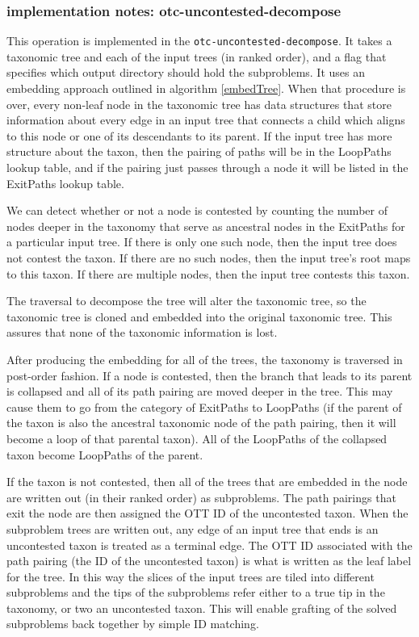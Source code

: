 \documentclass[11pt]{article}
\begin{document}
\subsubsection{implementation notes: otc-uncontested-decompose}
This operation is implemented in the {\tt otc-uncontested-decompose}.
It takes a taxonomic tree and each of the input trees (in ranked order), and a flag
    that specifies which output directory should hold the subproblems.
It uses an embedding approach outlined in algorithm \ref{embedTree}.
When that procedure is over, every non-leaf node in the taxonomic tree
    has data structures that store information about every edge in 
    an input tree that connects a child which aligns to this node or one of its descendants
    to its parent.
If the input tree has more structure about the taxon, then the pairing of paths will be in the 
    LoopPaths lookup table, and if the pairing just passes through a node it will be listed in
    the ExitPaths lookup table.

We can detect whether or not a node is contested by counting the number of nodes deeper in the 
    taxonomy that serve as ancestral nodes in the ExitPaths for a particular input tree.
If there is only one such node, then the input tree does not contest the taxon.
If there are no such nodes, then the input tree's root maps to this taxon.
If there are multiple nodes, then the input tree contests this taxon.
\ProofWriteupNeeded

The traversal to decompose the tree will alter the taxonomic tree, so the taxonomic tree 
     is cloned and embedded into the original taxonomic tree.
This assures that none of the taxonomic information is lost.

After producing the embedding for all of the trees, the taxonomy is traversed in post-order
    fashion.
If a node is contested, then the branch that leads to its parent is collapsed and
    all of its path pairing are moved deeper in the tree.
This may cause them to go from the category of ExitPaths to LoopPaths (if the parent of the
    taxon is also the ancestral taxonomic node of the path pairing, then it will become
    a loop of that parental taxon).
All of the LoopPaths of the collapsed taxon become LoopPaths of the parent.

If the taxon is not contested, then all of the trees that are embedded in the node
    are written out (in their ranked order) as subproblems.
The path pairings that exit the node are then assigned the OTT ID of the uncontested taxon.
When the subproblem trees are written out, any edge of an input tree that ends is an uncontested
    taxon is treated as a terminal edge.
The OTT ID associated with the path pairing (the ID of the uncontested taxon) is what is
    written as the leaf label for the tree.
In this way the slices of the input trees are tiled into different subproblems and the tips
    of the subproblems refer either to a true tip in the taxonomy, or two an uncontested taxon.
This will enable grafting of the solved subproblems back together by simple ID matching.
\end{document}

